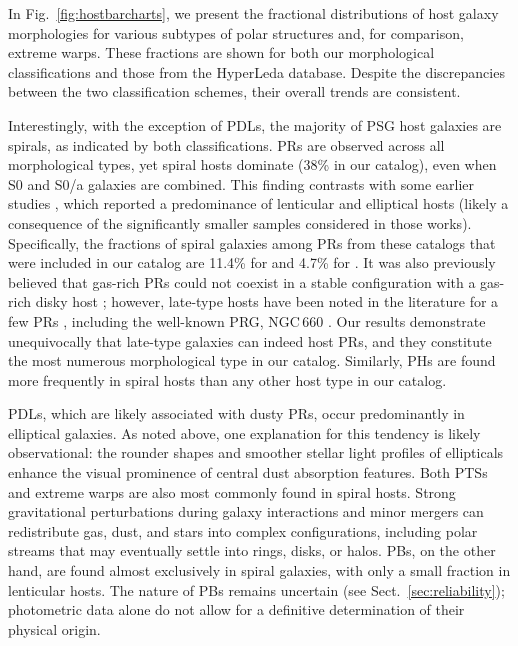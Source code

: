 \documentclass{aa}
\begin{document}
In Fig.~\ref{fig:hostbarcharts}, we present the fractional distributions of host galaxy morphologies for various subtypes of polar structures and, for comparison, extreme warps. These fractions are shown for both our morphological classifications and those from the HyperLeda database. Despite the discrepancies between the two classification schemes, their overall trends are consistent. 

Interestingly, with the exception of PDLs, the majority of PSG host galaxies are spirals, as indicated by both classifications. PRs are observed across all morphological types, yet spiral hosts dominate (38\% in our catalog), even when S0 and S0/a galaxies are combined. This finding contrasts with some earlier studies \citep{1990AJ....100.1489W, 2011MNRAS.418..244M}, which reported a predominance of lenticular and elliptical hosts (likely a consequence of the significantly smaller samples considered in those works). Specifically, the fractions of spiral galaxies among PRs from these catalogs that were included in our catalog are 11.4\% for \citet{1990AJ....100.1489W} and 4.7\% for \citet{2011MNRAS.418..244M}. It was also previously believed that gas-rich PRs could not coexist in a stable configuration with a gas-rich disky host \citep[see e.g.][]{2006ApJ...643..200I}; however, late-type hosts have been noted in the literature for a few PRs \citep{2014ASPC..486...61M}, including the well-known PRG, NGC\,660 \citep{1995AJ....109..942V}. Our results demonstrate unequivocally that late-type galaxies can indeed host PRs, and they constitute the most numerous morphological type in our catalog. Similarly, PHs are found more frequently in spiral hosts than any other host type in our catalog. 

PDLs, which are likely associated with dusty PRs, occur predominantly in elliptical galaxies. As noted above, one explanation for this tendency is likely observational: the rounder shapes and smoother stellar light profiles of ellipticals enhance the visual prominence of central dust absorption features. Both PTSs and extreme warps are also most commonly found in spiral hosts. Strong gravitational perturbations during galaxy interactions and minor mergers can redistribute gas, dust, and stars into complex configurations, including polar streams that may eventually settle into rings, disks, or halos. PBs, on the other hand, are found almost exclusively in spiral galaxies, with only a small fraction in lenticular hosts. The nature of PBs remains uncertain (see Sect.~\ref{sec:reliability}); photometric data alone do not allow for a definitive determination of their physical origin.
\end{document}
